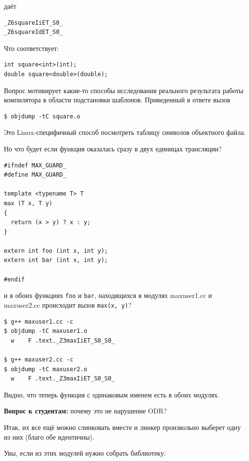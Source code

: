 \documentclass[a4paper,12pt,oneside]{article}
\newif\ifanswers
\begin{document}
даёт 

\begin{verbatim}
_Z6squareIiET_S0_
_Z6squareIdET_S0_ 
\end{verbatim}

Что соответствует:

\begin{lstlisting}
int square<int>(int);
double square<double>(double);
\end{lstlisting}
\fi

Вопрос мотивирует какие-то способы исследования реального результата работы компилятора в области подстановки шаблонов. Приведенный в ответе вызов

\begin{verbatim}
$ objdump -tC square.o
\end{verbatim}

Это Linux-специфичный способ посмотреть таблицу символов объектного файла.

Но что будет если функция оказалась сразу в двух единицах трансляции?

\begin{lstlisting}
#ifndef MAX_GUARD_
#define MAX_GUARD_

template <typename T> T
max (T x, T y)
{
  return (x > y) ? x : y;
}

extern int foo (int x, int y);
extern int bar (int x, int y);

#endif
\end{lstlisting}

и в обоих функциях \lstinline!foo! и \lstinline!bar!, находящихся в модулях maxuser1.cc и maxuser2.cc происходит вызов \lstinline!max(x, y)!?

\begin{verbatim}
$ g++ maxuser1.cc -c
$ objdump -tC maxuser1.o
  w    F .text._Z3maxIiET_S0_S0_

$ g++ maxuser2.cc -c
$ objdump -tC maxuser2.o
  w    F .text._Z3maxIiET_S0_S0_
\end{verbatim}

Видно, что теперь функция с одинаковым именем есть в обоих модулях.

\textbf{Вопрос к студентам:} почему это не нарушение ODR?

\ifanswers
Верный ответ: в ODR для шаблонных функций слово one означает один на модуль
\fi

Итак, их все ещё можно слинковать вместе и линкер произвольно выберет одну из них (благо обе идентичны).

Увы, если из этих модулей нужно собрать библиотеку:
\end{document}
